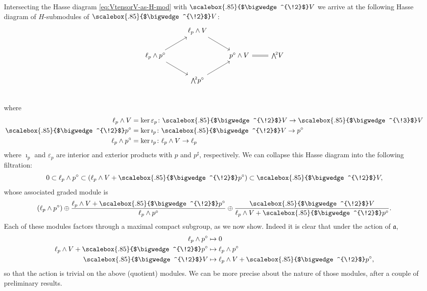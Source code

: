 \documentclass[11pt,reqno,a4paper,final]{amsart}
\newcommand\ext[1]{\scalebox{.85}{$\bigwedge^{\!#1}$}}
\theoremstyle{plain}
\theoremstyle{definition}
\newcommand{\fa}{\mathfrak{a}}
\newcommand{\1}{\mathbb{1}}
\numberwithin{equation}{section}
\begin{document}
Intersecting the Hasse diagram \eqref{eq:VtensorV-as-H-mod} with
$\ext{2}V$ we arrive at the following Hasse diagram of $H$-submodules
of $\ext{2}V$:
\begin{equation}
  \label{eq:VwedgeV-as-H-mod}
  \begin{tikzcd}
    & \ell_p \wedge V \arrow[rd] & & \\
    \ell_p \wedge p^\circ \arrow[rd] \arrow[ru] & & p^\circ \wedge V \arrow[r,equal] & \ext{2}V\\  
    & \ext{2}p^\circ \arrow[ru] & & \\
  \end{tikzcd}
\end{equation}
where
\begin{equation}
  \begin{split}
    \ell_p \wedge V &= \ker \varepsilon_p \colon \ext{2}V \to \ext{3}V\\
    \ext{2}p^\circ &= \ker \imath_p \colon \ext{2}V \to p^\circ\\
    \ell_p \wedge p^\circ &= \ker \imath_p \colon \ell_p \wedge V \to \ell_p
  \end{split}
\end{equation}
where $\imath_p$ and $\varepsilon_p$ are interior and exterior
products with $p$ and $p^\sharp$, respectively.  We can collapse this
Hasse diagram into the following filtration:
\begin{equation}
  \label{eq:VwedgeV-filtered}
  0 \subset  \ell_p \wedge p^\circ \subset \left( \ell_p \wedge V + \ext{2}p^\circ  \right) \subset \ext{2}V,
\end{equation}
whose associated graded module is
\begin{equation}
  \label{eq:VwedgeV-assoc-graded}
  \left( \ell_p \wedge p^\circ  \right)\oplus \dfrac{\ell_p \wedge V + \ext{2}p^\circ}{\ell_p \wedge p^\circ}\oplus \dfrac{\ext{2}V}{\ell_p \wedge V + \ext{2}p^\circ}.
\end{equation}
Each of these modules factors through a maximal compact subgroup, as
we now show.  Indeed it is clear that under the action of $\fa$,
\begin{equation}
  \begin{split}
    \ell_p \wedge p^\circ & \mapsto 0\\
    \ell_p \wedge V + \ext{2} p^\circ & \mapsto \ell_p \wedge p^\circ\\
    \ext{2} V & \mapsto \ell_p \wedge V + \ext{2} p^\circ,
  \end{split}
\end{equation}
so that the action is trivial on the above (quotient) modules.  We can
be more precise about the nature of those modules, after a couple of
preliminary results.
\end{document}

